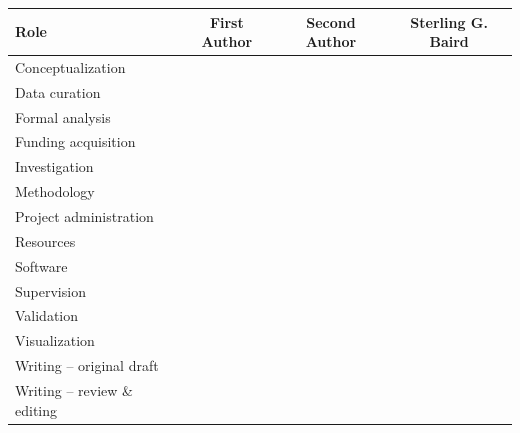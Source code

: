 \begin{tabular}{@{}lccc@{}}
\toprule
Role & First Author & Second Author & Sterling G. Baird \\
\midrule
Conceptualization &  &  &  \\
Data curation &  &  &  \\
Formal analysis &  &  &  \\
Funding acquisition &  &  &  \\
Investigation &  &  &  \\
Methodology &  &  &  \\
Project administration &  &  &  \\
Resources &  &  &  \\
Software &  &  &  \\
Supervision &  &  &  \\
Validation &  &  &  \\
Visualization &  &  &  \\
Writing -- original draft &  &  &  \\
Writing -- review \& editing &  &  &  \\
\bottomrule
\end{tabular}
